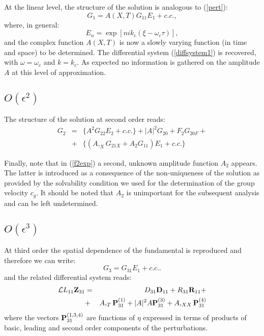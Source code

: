 \documentclass[12pt,a4paper,twocolumn,fleqn]{narms}
\begin{document}
At the linear level, the structure of the solution is analogous to
(\ref{pert}):
\begin{equation}
G_1 = A(X,T) G_{11} E_1 + c.c.,\label{pert}
\end{equation}
where, in general:
\begin{equation}
E_n= \exp [ n i k_c (\xi - \omega_c \tau)],\label{diffsystem1}
\end{equation}
and the complex function $A(X,T)$ is now a slowly varying function (in time and space) to
be determined. The differential system (\ref{diffsystem1}) is
recovered, with $\omega = \omega_c$ and $k = k_c$. As expected no
information is gathered on the amplitude $A$ at this level of
approximation.

\subsection{$O(\epsilon^2)$}

The structure of the solution at second order reads:
\begin{eqnarray}
G_2 &=& \{ A^2 G_{22} E_2 + c.c.\} + |A|^2 G_{20} + F_2 G_{20F} +
\nonumber \\
&+& \{(A,_X G_{21X} +A_2 G_{11} ) E_1  + c.c.\}
\label{f2exp}
\end{eqnarray}


Finally, note that in (\ref{f2exp}) a second, unknown amplitude
function $A_2$ appears. The latter is introduced as a consequence of
the non-uniqueness of the solution as provided by the solvability
condition we used for the determination of the group velocity
$c_g$. It should be noted that $A_2$ is unimportant for the subsequent
analysis and can be left undetermined.

\subsection{$O(\epsilon^3)$}

At third order the spatial dependence of the fundamental is
reproduced and therefore we can write:
\begin{equation}
G_3 = G_{31} E_1 + c.c..
\end{equation}
and the related differential system reads:
\begin{eqnarray}
\hbox{${\pcal L}$}{L}_{11} \hbox{\bf Z}_{31} &=& D_{31} \hbox{\bf
D}_{11} + R_{31} \hbox{\bf R}_{11} +
 \\
&+& A,_T \hbox{\bf P}_{31}^{(1)} + |A|^2 A \hbox{\bf P}_{31}^{(3)}
+ A,_{XX} \hbox{\bf P}_{31}^{(4)} \nonumber \label{diffsystem31}
\end{eqnarray}
where the vectors $\hbox{\bf P}_{31}^{(1,3,4)}$ are functions of
$\eta$ expressed in terms of products of basic, leading and second
order components of the perturbations.
\end{document}
